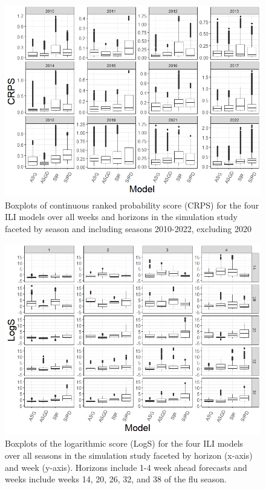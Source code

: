 \documentclass[ba]{imsart}
\theoremstyle{plain}
\theoremstyle{definition}
\theoremstyle{remark}
\begin{document}
\begin{supplement}
\begin{figure}[hbt!]
    \centering
    \includegraphics[scale=.5]{Images/crps_by_season.png}
    \caption{Boxplots of continuous ranked probability score (CRPS) for the four ILI models over all weeks and horizons in the simulation study faceted by season and including seasons 2010-2022, excluding 2020}
    \label{fig:crps_by_season}
\end{figure}


\begin{figure}[hbt!]
    \centering
    \includegraphics[scale=.4]{Images/logs_by_week_horizon.png}
    \caption{Boxplots of the logarithmic score (LogS) for the four ILI models over all seasons in the simulation study faceted by horizon (x-axis) and week (y-axis). Horizons include 1-4 week ahead forecasts and weeks include weeks 14, 20, 26, 32, and 38 of the flu season.}
    \label{fig:logs_by_week_horizon}
\end{figure}



\end{supplement}
\end{document}
